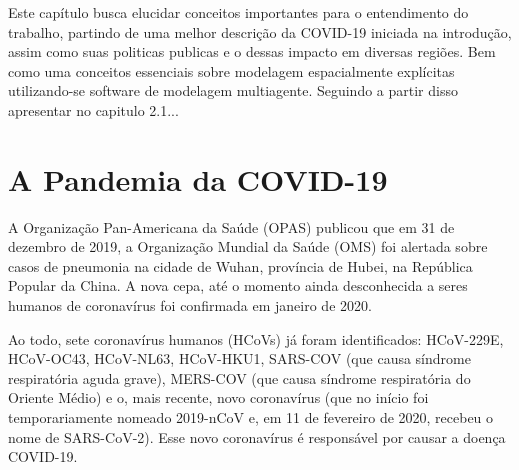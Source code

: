 \newcommand{\texCommand}[1]{\texttt{\textbackslash{#1}}}%

\newcommand{\exemplo}[1]{%
\vspace{\baselineskip}%
\noindent\fbox{\begin{minipage}{\textwidth}#1\end{minipage}}%
\\\vspace{\baselineskip}}%

\newcommand{\exemploVerbatim}[1]{%
\vspace{\baselineskip}%
\noindent\fbox{\begin{minipage}{\textwidth}%
#1\end{minipage}}%
\\\vspace{\baselineskip}}%


Este capítulo busca elucidar conceitos importantes para o entendimento do trabalho, partindo de uma melhor descrição da COVID-19 iniciada na introdução, assim como suas politicas publicas e o dessas impacto em diversas regiões. Bem como uma conceitos essenciais sobre modelagem espacialmente explícitas utilizando-se software de modelagem multiagente. Seguindo a partir disso apresentar no capitulo 2.1...

\section{A Pandemia da COVID-19}

A Organização Pan-Americana da Saúde (OPAS) publicou que em 31 de dezembro de 2019, a Organização Mundial da Saúde (OMS) foi alertada sobre casos de pneumonia na cidade de Wuhan, província de Hubei, na República Popular da China. A nova cepa, até o momento ainda desconhecida a seres humanos de coronavírus foi confirmada em janeiro de 2020.

Ao todo, sete coronavírus humanos (HCoVs) já foram identificados: HCoV-229E, HCoV-OC43, HCoV-NL63, HCoV-HKU1, SARS-COV (que causa síndrome respiratória aguda grave), MERS-COV (que causa síndrome respiratória do Oriente Médio) e o, mais recente, novo coronavírus (que no início foi temporariamente nomeado 2019-nCoV e, em 11 de fevereiro de 2020, recebeu o nome de SARS-CoV-2). Esse novo coronavírus é responsável por causar a doença COVID-19.

